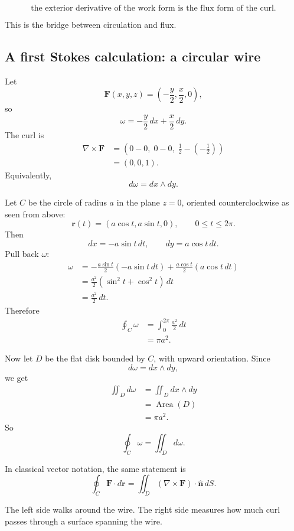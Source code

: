 \[
\boxed{
    \text{the exterior derivative of the work form is the flux form of the curl.}
}
\]

This is the bridge between circulation and flux.

\subsection{A first Stokes calculation: a circular wire}

Let
\[
    \mathbf F(x,y,z)=\left(-\frac y2,\frac x2,0\right),
\]
so
\[
    \omega=-\frac y2\,dx+\frac x2\,dy.
\]
The curl is
\[
\begin{aligned}
\nabla\times\mathbf F
&=
(0-0,\;0-0,\;\frac12-(-\frac12))\\
&=
(0,0,1).
\end{aligned}
\]
Equivalently,
\[
    d\omega=dx\wedge dy.
\]

Let \(C\) be the circle of radius \(a\) in the plane \(z=0\), oriented counterclockwise
as seen from above:
\[
    \mathbf r(t)=(a\cos t,a\sin t,0),
    \qquad 0\le t\le 2\pi.
\]
Then
\[
    dx=-a\sin t\,dt,
    \qquad
    dy=a\cos t\,dt.
\]
Pull back \(\omega\):
\[
\begin{aligned}
\omega
&=
-\frac{a\sin t}{2}(-a\sin t\,dt)
+
\frac{a\cos t}{2}(a\cos t\,dt)\\
&=
\frac{a^2}{2}(\sin^2t+\cos^2t)\,dt\\
&=
\frac{a^2}{2}\,dt.
\end{aligned}
\]
Therefore
\[
\begin{aligned}
\oint_C \omega
&=
\int_0^{2\pi}\frac{a^2}{2}\,dt\\
&=
\pi a^2.
\end{aligned}
\]

Now let \(D\) be the flat disk bounded by \(C\), with upward orientation.  Since
\[
    d\omega=dx\wedge dy,
\]
we get
\[
\begin{aligned}
\iint_D d\omega
&=
\iint_D dx\wedge dy\\
&=
\operatorname{Area}(D)\\
&=
\pi a^2.
\end{aligned}
\]
So
\[
\boxed{
    \oint_C \omega=\iint_D d\omega.
}
\]

In classical vector notation, the same statement is
\[
\boxed{
    \oint_C \mathbf F\cdot d\mathbf r
    =
    \iint_D (\nabla\times\mathbf F)\cdot\widehat{\mathbf n}\,dS.
}
\]

The left side walks around the wire.  The right side measures how much curl passes
through a surface spanning the wire.

